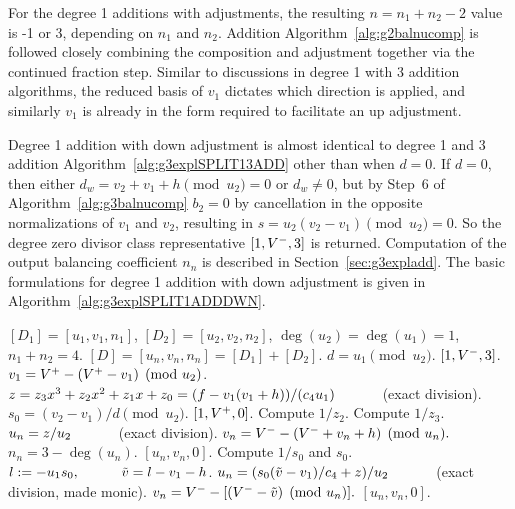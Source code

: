 For the degree 1 additions with adjustments, the resulting $n = n_1 + n_2 - 2$
value is -1 or 3, depending on $n_1$ and $n_2$. Addition
Algorithm~\ref{alg:g2balnucomp} is followed closely combining the composition
and adjustment together via the continued fraction step. Similar to discussions
in degree 1 with 3 addition algorithms, the reduced basis of $v_1$ dictates
which direction is applied, and similarly $v_1$ is already in the form required
to facilitate an up adjustment. 

Degree 1 addition with down adjustment is almost identical to degree 1 and 3
addition Algorithm~\ref{alg:g3explSPLIT13ADD} other than when $d = 0$. If $d=0$,
then either $d_w = v_2 + v_1 +h \pmod{u_2} = 0$ or $d_w \neq 0$, but by Step~6
of Algorithm~\ref{alg:g3balnucomp} $b_2 =0 $ by cancellation in the opposite
normalizations of $v_1$ and $v_2$, resulting in $s = u_2(v_2 - v_1) \pmod{u_2} =
0$. So the degree zero divisor class representative $[1,V^{-},3]$ is returned.
Computation of the output balancing coefficient $n_n$ is described in
Section~\ref{sec:g3expladd}. The basic formulations for degree 1 addition with
down adjustment is given in Algorithm~\ref{alg:g3explSPLIT1ADDDWN}.

\begin{algorithm}[H]
    \caption{Genus 3 Split Model Degree 1 Addition with Down Adjust\label{alg:g3explSPLIT1ADDDWN}}
    \begin{algorithmic} [1]
    \Require $[D_1] = [u_1,v_1,n_1]$, $[D_2] = [u_2,v_2,n_2]$, $\deg(u_2) = \deg(u_1) = 1$, $n_1 + n_2 = 4$.
    \Ensure $[D] = [u_n,v_n,n_n] = [D_1] + [D_2] $.
    \algrule
    \vspace{-2pt}
    \State $d = u_1 \pmod{u_2}$.
     \hspace{3pt} \Return $[1,V^{-}, 3]$.
    \EndIf
    \State $v_1 = V^{+} - (V^{+} - v_1) \pmod{u_2}$.
    \State $z = z_3x^3 + z_2x^2 + z_1x + z_0 = (f - v_1(v_1 + h))/(c_4u_1) \quad\quad\quad$ (exact division).  
    \State $s_0 = (v_2 - v_1)/d \pmod{u_2}$.
             \Return $[1,V^{+},0]$.
            \Else \hspace{3pt} Compute $1/z_2$.
            \EndIf
        \Else \hspace{3pt} Compute $1/z_3$.
        \EndIf
        \State $u_n = z/u_2 \quad\quad\quad$ (exact division).
        \State $v_n = V^{-} - (V^{-} + v_n + h) \pmod{u_n}.$
        \State $n_n = 3 - \deg(u_n)$.
        \State \Return $[u_n,v_n,0]$.
    \EndIf
    \State Compute $1/s_0$ and $s_0$.
    \State $l := -u_1s_0, \quad\quad\quad \tilde{v} = l - v_1 - h$.
    \State $u_n = (s_0(\tilde{v} - v_1)/c_4 + z)/u_2 \quad\quad\quad$ (exact division, made monic).
    \State $v_n = V^{-} - [(V^{-} - \tilde{v}) \pmod{u_n}].$ 
    \State \Return $[u_n,v_n,0]$.
    \vspace{-2pt}
    \end{algorithmic}
    \end{algorithm}

